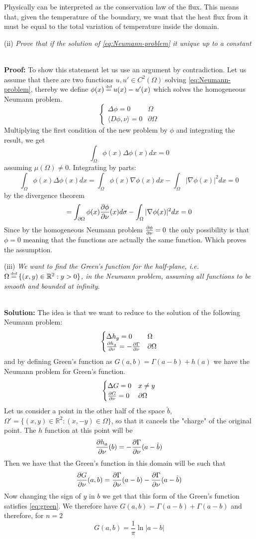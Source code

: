 \documentclass{article}
\newcommand{\R}{\mathbb{R}}
\newcommand{\ex}{\textit}
\newcommand{\sol}{\\ \textbf{Solution: }}
\newcommand{\proof}{\\ \textbf{Proof: }}
\newcommand*{\eqdef}{\ensuremath{\overset{\mathclap{\text{\tiny def}}}{=}}}
\begin{document}
Physically can be interpreted as the conservation law of the flux. This means that, given the temperature of the boundary, we want that the heat flux from it must be equal to the total variation of temperature inside the domain.

(ii) \ex {Prove that if the solution of \eqref{eq:Neumann-problem} it unique up to a constant}

\proof To show this statement let us use an argument by contradiction. Let us assume that there are two functions $u, u' \in C^2(\Omega)$ solving \eqref{eq:Neumann-problem}, thereby we define $\phi(x) \eqdef u(x) - u'(x)$ which solves the homogeneous Neumann problem.
\[
    \begin{cases}
        \Delta \phi = 0 & \Omega\\
        \langle D\phi, \nu \rangle = 0 & \partial \Omega
    \end{cases}
\]
Multiplying the first condition of the new problem by $\phi$ and integrating the result, we get
\[
    \int_\Omega \phi (x) \Delta \phi (x) dx = 0
\]
assuming $\mu(\Omega) \neq 0$. Integrating by parts:
\[
    \int_\Omega \phi (x) \Delta \phi (x) dx = \int_\Omega \phi (x) \nabla \phi (x) dx - \int_\Omega |\nabla \phi (x)|^2 dx = 0
\]
by the divergence theorem
\[
    = \int_{\partial\Omega} \phi (x)  \pdv{\phi}{\nu} (x) d\sigma - \int_\Omega |\nabla \phi (x)|^2 dx = 0
\]
Since by the homogeneous Neumann problem $\pdv{\phi}{\nu} = 0$ the only possibility is that $\phi = 0$ meaning that the functions are actually the same function. Which proves the assumption.

(iii) \ex{We want to find the Green's function for the half-plane, i.e. $\Omega \eqdef \{ (x, y)\in \R^2 : y>0 \}$, in the Neumann problem, assuming all functions to be smooth and bounded at infinity.}

\sol The idea is that we want to reduce to the solution of the following Neumann problem:
\[
    \begin{cases}
        \Delta h_g = 0  & \Omega\\
        \pdv{h_g}{\nu} = - \pdv{\Gamma}{\nu} & \partial \Omega
    \end{cases}
\]
and by defining Green's function as $G(a,b) = \Gamma (a-b) + h(a)$ we have the Neumann problem for Green's function.
\begin{equation} \label{eq:green}
    \begin{cases}
        \Delta G = 0 & x \neq y\\
        \pdv{G}{\nu} = 0 & \partial \Omega
    \end{cases}
\end{equation}
Let us consider a point in the other half of the space $\tilde b$, $\Omega' = \{ (x,y)\in \R^2 : (x,-y) \in \Omega \}$, so that it cancels the "charge" of the original point.
The $h$ function at this point will be 
\[
    \pdv{h_a}{\nu} (b) = - \pdv{\Gamma}{\nu} (a-\tilde b)
\]
Then we have that the Green's function in this domain will be such that 
\[
    \pdv{G}{\nu} (a,b) =  \pdv{\Gamma}{\nu} (a- b) - \pdv{\Gamma}{\nu} (a-\tilde b)
\]
Now changing the sign of $y$ in $b$ we get that this form of the Green's function satisfies \eqref{eq:green}.
We therefore have $G(a,b) = \Gamma(a-b) + \Gamma (a-b)$ and therefore, for $n = 2$
\[
    G (a,b) = \frac{1}{\pi} \ln{|a-b|}
\]
\end{document}
